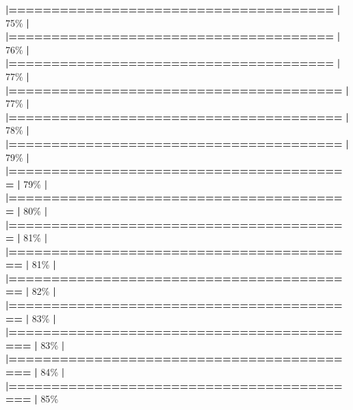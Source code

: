 \documentclass[
]{book}
\newenvironment{Shaded}{\begin{snugshade}}{\end{snugshade}}
\newcommand{\DecValTok}[1]{\textcolor[rgb]{0.00,0.00,0.81}{#1}}
\newcommand{\ErrorTok}[1]{\textcolor[rgb]{0.64,0.00,0.00}{\textbf{#1}}}
\newcommand{\NormalTok}[1]{#1}
\newcommand{\SpecialCharTok}[1]{\textcolor[rgb]{0.81,0.36,0.00}{\textbf{#1}}}
\begin{document}
\begin{Shaded}
\begin{Highlighting}[]
  \ErrorTok{|======================================}            \ErrorTok{|}  \DecValTok{75}\NormalTok{\%}
  \SpecialCharTok{|}                                                        
  \ErrorTok{|======================================}            \ErrorTok{|}  \DecValTok{76}\NormalTok{\%}
  \SpecialCharTok{|}                                                        
  \ErrorTok{|======================================}            \ErrorTok{|}  \DecValTok{77}\NormalTok{\%}
  \SpecialCharTok{|}                                                        
  \ErrorTok{|=======================================}           \ErrorTok{|}  \DecValTok{77}\NormalTok{\%}
  \SpecialCharTok{|}                                                        
  \ErrorTok{|=======================================}           \ErrorTok{|}  \DecValTok{78}\NormalTok{\%}
  \SpecialCharTok{|}                                                        
  \ErrorTok{|=======================================}           \ErrorTok{|}  \DecValTok{79}\NormalTok{\%}
  \SpecialCharTok{|}                                                        
  \ErrorTok{|========================================}          \ErrorTok{|}  \DecValTok{79}\NormalTok{\%}
  \SpecialCharTok{|}                                                        
  \ErrorTok{|========================================}          \ErrorTok{|}  \DecValTok{80}\NormalTok{\%}
  \SpecialCharTok{|}                                                        
  \ErrorTok{|========================================}          \ErrorTok{|}  \DecValTok{81}\NormalTok{\%}
  \SpecialCharTok{|}                                                        
  \ErrorTok{|=========================================}         \ErrorTok{|}  \DecValTok{81}\NormalTok{\%}
  \SpecialCharTok{|}                                                        
  \ErrorTok{|=========================================}         \ErrorTok{|}  \DecValTok{82}\NormalTok{\%}
  \SpecialCharTok{|}                                                        
  \ErrorTok{|=========================================}         \ErrorTok{|}  \DecValTok{83}\NormalTok{\%}
  \SpecialCharTok{|}                                                        
  \ErrorTok{|==========================================}        \ErrorTok{|}  \DecValTok{83}\NormalTok{\%}
  \SpecialCharTok{|}                                                        
  \ErrorTok{|==========================================}        \ErrorTok{|}  \DecValTok{84}\NormalTok{\%}
  \SpecialCharTok{|}                                                        
  \ErrorTok{|==========================================}        \ErrorTok{|}  \DecValTok{85}\NormalTok{\%}

\end{Highlighting}
\end{Shaded}
\end{document}

